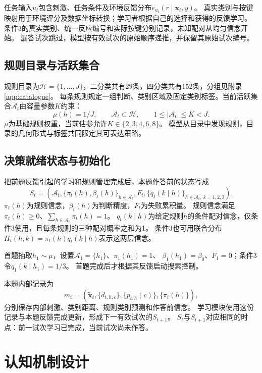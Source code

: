 \documentclass[11pt,a4paper]{article}
\numberwithin{equation}{section}
\newcommand{\A}{\mathcal{A}}
\newcommand{\Hh}{\mathcal{H}}
\begin{document}
任务输入$u_t$包含刺激、任务条件及环境反馈分布$e_{u_t}(r\mid\bm x_t,y)$。
真实类别与按键映射用于环境评分及数据坐标转换；学习者根据自己的选择和获得的反馈学习。
条件3的真实类别、统一反应编号和实际按键分别记录，未知配对从均匀信念开始。
漏答试次跳过，模型按有效试次的原始顺序递推，并保留其原始试次编号。

\subsection{规则目录与活跃集合}
规则目录为$\Hh=\{1,\ldots,J\}$，二分类共有29条，四分类共有152条，分组见附录\ref{app:catalogue}。
每条规则规定一组判断、类别区域及固定类别标签。当前活跃集合$\A_t$由容量参数$K$约束：
\begin{equation}
\mu(h)=1/J,\qquad \A_t\subset\Hh,\qquad 1\leq|\A_t|\leq K<J.
\label{eq:capacity}
\end{equation}
$\mu$为基础规则权重，当前估参允许$K\in\{2,3,4,6,8\}$。
模型从目录中发现规则，目录的几何形式与标签共同限定其可表达策略。


\subsection{决策就绪状态与初始化}
把前题反馈引起的学习和规则管理完成后，本题作答前的状态写成
\begin{equation}
S_t=\left(\A_t,\{\pi_t(h),\beta_t(h)\}_{h\in\A_t},F_t,
\{q_t(k\mid h)\}_{h\in\A_t,\ k=1,2,3}\right).
\label{eq:state}
\end{equation}
$\pi_t(h)$为规则信念，$\beta_t(h)$为判断精度，$F_t$为失败累积量。
规则信念满足$\pi_t(h)\geq0$、$\sum_{h\in\A_t}\pi_t(h)=1$。
$q_t(k\mid h)$为给定规则$h$的条件配对信念，仅条件3使用，且每条规则的三种配对概率之和为1。
条件3也可用联合分布$\Pi_t(h,k)=\pi_t(h)q_t(k\mid h)$表示这两层信念。

首题抽取$h_1\sim\mu$，设置$\A_1=\{h_1\}$、$\pi_1(h_1)=1$、
$\beta_1(h_1)=\beta_0$、$F_1=0$；条件3令$q_1(k\mid h_1)=1/3$。
首题完成后才根据其反馈启动搜索控制。

本题内部记录为
\begin{equation}
m_t=\left(\widetilde{\bm x}_t,\{d_{t,h,c}\},\{p_{t,h}(c)\},\{\pi_t(h)\}\right),
\end{equation}
分别保存内部刺激、类别距离、规则类别预测和作答前信念。
学习模块使用这份记录与本题反馈完成更新，形成下一有效试次的$S_{t+1}$。
$S_t$与$S_{t+1}$对应相同的时点：前一试次学习已完成，当前试次尚未作答。

\section{认知机制设计}
\label{sec:mechanisms}
\end{document}
